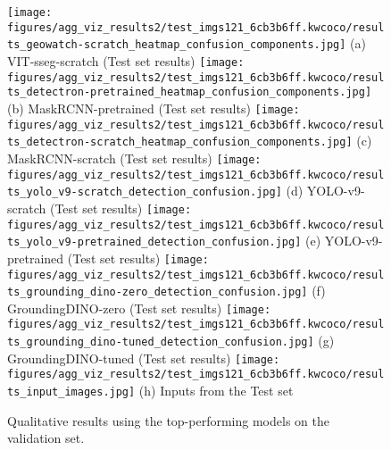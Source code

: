\documentclass{article}
\begin{document}
\begin{figure*}[ht]
\centering
\texttt{[image: figures/agg\_viz\_results2/test\_imgs121\_6cb3b6ff.kwcoco/results\_geowatch-scratch\_heatmap\_confusion\_components.jpg]}%
\hfill
(a) VIT-sseg-scratch (Test set results)
\texttt{[image: figures/agg\_viz\_results2/test\_imgs121\_6cb3b6ff.kwcoco/results\_detectron-pretrained\_heatmap\_confusion\_components.jpg]}%
\hfill
(b) MaskRCNN-pretrained (Test set results)
\texttt{[image: figures/agg\_viz\_results2/test\_imgs121\_6cb3b6ff.kwcoco/results\_detectron-scratch\_heatmap\_confusion\_components.jpg]}%
\hfill
(c) MaskRCNN-scratch (Test set results)
\texttt{[image: figures/agg\_viz\_results2/test\_imgs121\_6cb3b6ff.kwcoco/results\_yolo\_v9-scratch\_detection\_confusion.jpg]}%
\hfill
(d) YOLO-v9-scratch (Test set results)
\texttt{[image: figures/agg\_viz\_results2/test\_imgs121\_6cb3b6ff.kwcoco/results\_yolo\_v9-pretrained\_detection\_confusion.jpg]}%
\hfill
(e) YOLO-v9-pretrained (Test set results)
\texttt{[image: figures/agg\_viz\_results2/test\_imgs121\_6cb3b6ff.kwcoco/results\_grounding\_dino-zero\_detection\_confusion.jpg]}%
\hfill
(f) GroundingDINO-zero (Test set results)
\texttt{[image: figures/agg\_viz\_results2/test\_imgs121\_6cb3b6ff.kwcoco/results\_grounding\_dino-tuned\_detection\_confusion.jpg]}%
\hfill
(g) GroundingDINO-tuned (Test set results)
\texttt{[image: figures/agg\_viz\_results2/test\_imgs121\_6cb3b6ff.kwcoco/results\_input\_images.jpg]}%
\hfill
(h) Inputs from the Test set
\caption[]{
    Qualitative results using the top-performing models on the validation set.
}
\label{fig:test_results_all_models}
\end{figure*}
\end{document}

